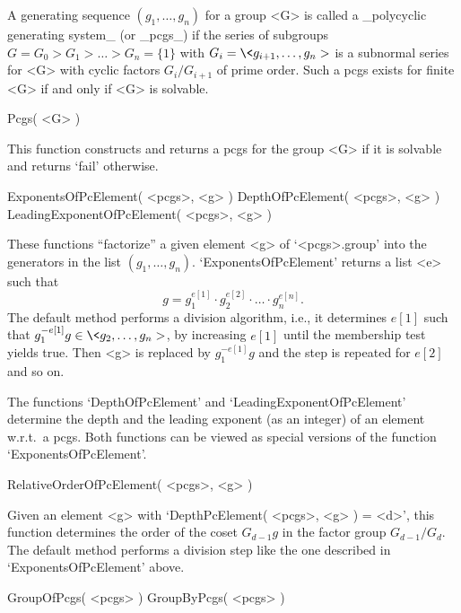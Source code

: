 

A generating  sequence  $(g_1,\ldots,g_n)$ for a group   <G> is called  a
_polycyclic generating system_ (or _pcgs_) if the  series of subgroups $G
= G_0 > G_1 > \ldots >  G_n = \{1\}$ with $G_i  = \< g_{i+1}, \ldots, g_n
>$  is a subnormal  series for <G>  with cyclic  factors $G_i/G_{i+1}$ of
prime  order. Such a pcgs  exists  for finite <G> if   and only if <G> is
solvable.

\>Pcgs( <G> )

This function constructs  and returns a  pcgs for the group  <G> if it is
solvable and returns `fail' otherwise.

\>ExponentsOfPcElement( <pcgs>, <g> )
\>DepthOfPcElement( <pcgs>, <g> )
\>LeadingExponentOfPcElement( <pcgs>, <g> )

These functions ``factorize'' a given  element <g> of `<pcgs>.group' into
the  generators  in  the  list $(g_1,\ldots,g_n)$. `ExponentsOfPcElement'
returns a list <e> such that
$$ g = g_1^{e[1]} \cdot g_2^{e[2]} \cdot \ldots \cdot g_n^{e[n]}. $$
The  default method  performs  a division algorithm,  i.e., it determines
$e[1]$ such that $g_1^{-e[1]}g \in \< g_2, \ldots,  g_n >$, by increasing
$e[1]$  until the membership  test yields  true. Then  <g> is replaced by
$g_1^{-e[1]}g$ and the step is repeated for $e[2]$ and so on.

The functions   `DepthOfPcElement'      and  `LeadingExponentOfPcElement'
determine  the depth  and  the leading  exponent   (as an integer)  of an
element w.r.t.\ a pcgs. Both functions can be  viewed as special versions
of the function `ExponentsOfPcElement'.

\>RelativeOrderOfPcElement( <pcgs>, <g> )

Given an element <g> with  `DepthPcElement( <pcgs>, <g>   ) = <d>',  this
function determines the order of the coset $G_{d-1}g$ in the factor group
$G_{d-1}/G_d$. The default method performs  a division step like the  one
described in `ExponentsOfPcElement' above.

\null
{}%

\>GroupOfPcgs( <pcgs> )
\>GroupByPcgs( <pcgs> )

